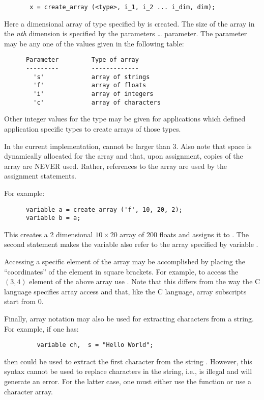 \begin{verbatim}
       x = create_array (<type>, i_1, i_2 ... i_dim, dim);
\end{verbatim}
   Here a  dimensional array of type specified by  is
   created.  The size of the array in the {\em nth} dimension is specified by
   the parameters \ldots{} parameter.  The 
   parameter may be any one of the values given in the following table:
\begin{verbatim}
      Parameter         Type of array
      ---------         -------------
        's'             array of strings
        'f'             array of floats
        'i'             array of integers
        'c'             array of characters
\end{verbatim}
   Other integer values for the type may be given for applications which
   defined application specific types to create arrays of those types.

   In the current implementation,  cannot be larger than $3$.  Also
   note that space is dynamically allocated for the array and that, upon
   assignment, copies of the array are NEVER used.  Rather, references to
   the array are used by the assignment statements.

   For example:
   
\begin{verbatim}
      variable a = create_array ('f', 10, 20, 2);
      variable b = a;
\end{verbatim}
   This creates a 2 dimensional $10 \times 20$ array of $200$ floats and
   assigns it to .  The second statement makes the variable  also
   refer to the array specified by variable .

   Accessing a specific element of the array may be accomplished by placing
   the ``coordinates'' of the element in square brackets.  For example, to
   access the $(3, 4)$ element of the above array use .  Note
   that this differs from the way the C language specifies array access and
   that, like the C language, array subscripts start from 0.

   Finally, array notation may also be used for extracting characters from a
   string.  For example, if one has:

\begin{verbatim}
         variable ch,  s = "Hello World";
\end{verbatim}

   then  could be used to extract the first character from
   the string .  However, this syntax cannot be used to replace
   characters in the string, i.e.,  is illegal and will
   generate an error.  For the latter case, one must either use the
    function or use a character array.


